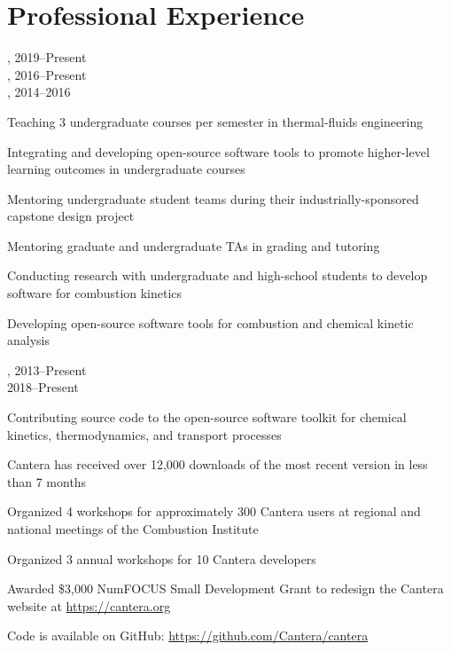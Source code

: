 \section{{\sectionfont{} Professional Experience}}

,  \hfill 2019--Present\\
,  \hfill 2016--Present\\
,  \hfill 2014--2016

\begin{innerlist}
    \item Teaching 3 undergraduate courses per semester in thermal-fluids engineering
    \item Integrating and developing open-source software tools to promote higher-level learning outcomes in undergraduate courses
    \item Mentoring undergraduate student teams during their industrially-sponsored capstone design project
    \item Mentoring graduate and undergraduate TAs in grading and tutoring
    \item Conducting research with undergraduate and high-school students to develop software for combustion kinetics
    \item Developing open-source software tools for combustion and chemical kinetic analysis
\end{innerlist}

\vspace{\baselineskip}

,  \hfill 2013--Present\\
 \hfill 2018--Present

\begin{innerlist}
    \item Contributing source code to the open-source software toolkit for chemical kinetics, thermodynamics, and transport processes
    \item Cantera has received over 12,000 downloads of the most recent version in less than 7 months
    \item Organized 4 workshops for approximately 300 Cantera users at regional and national meetings of the Combustion Institute
    \item Organized 3 annual workshops for 10 Cantera developers
    \item Awarded \$3,000 NumFOCUS Small Development Grant to redesign the Cantera website at \url{https://cantera.org}
    \item Code is available on GitHub: \url{https://github.com/Cantera/cantera}
\end{innerlist}

